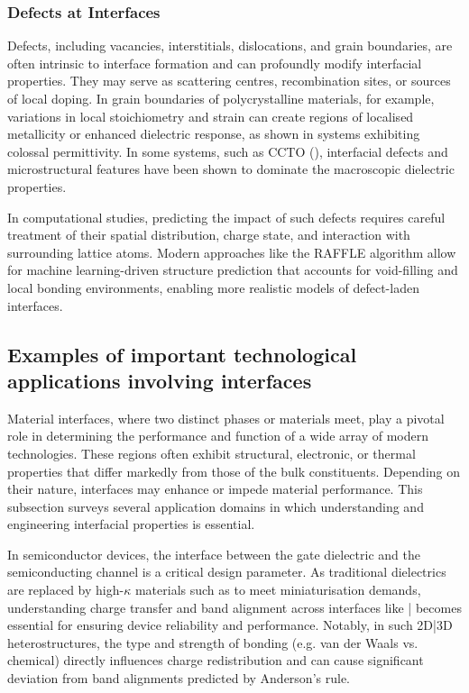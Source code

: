 \subsubsection{Defects at Interfaces} 

Defects, including vacancies, interstitials, dislocations, and grain boundaries, are often intrinsic to interface formation and can profoundly modify interfacial properties. They may serve as scattering centres, recombination sites, or sources of local doping. In grain boundaries of polycrystalline materials, for example, variations in local stoichiometry and strain can create regions of localised metallicity or enhanced dielectric response, as shown in systems exhibiting colossal permittivity. In some systems, such as CCTO (), interfacial defects and microstructural features have been shown to dominate the macroscopic dielectric properties.

In computational studies, predicting the impact of such defects requires careful treatment of their spatial distribution, charge state, and interaction with surrounding lattice atoms. Modern approaches like the RAFFLE algorithm allow for machine learning-driven structure prediction that accounts for void-filling and local bonding environments, enabling more realistic models of defect-laden interfaces.

\subsection{Examples of important technological applications involving interfaces} 

Material interfaces, where two distinct phases or materials meet, play a pivotal role in determining the performance and function of a wide array of modern technologies. These regions often exhibit structural, electronic, or thermal properties that differ markedly from those of the bulk constituents. Depending on their nature, interfaces may enhance or impede material performance. This subsection surveys several application domains in which understanding and engineering interfacial properties is essential.

In semiconductor devices, the interface between the gate dielectric and the semiconducting channel is a critical design parameter. As traditional  dielectrics are replaced by high-$\kappa$ materials such as  to meet miniaturisation demands, understanding charge transfer and band alignment across interfaces like |  becomes essential for ensuring device reliability and performance. Notably, in such 2D|3D heterostructures, the type and strength of bonding (e.g. van der Waals vs. chemical) directly influences charge redistribution and can cause significant deviation from band alignments predicted by Anderson's rule.

